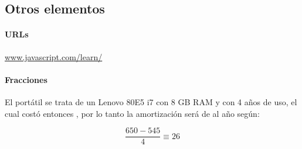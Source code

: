 \subsection*{Otros elementos}

\paragraph*{URLs}

\url{www.javascript.com/learn/}

\paragraph*{Fracciones}

El portátil se trata de un Lenovo 80E5 i7 con 8 GB RAM y con 4 años de uso, el cual costó entonces , por lo tanto la amortización será de  al año según:

\[\dfrac{650 - 545}{4} 
  \equiv 26
\]

